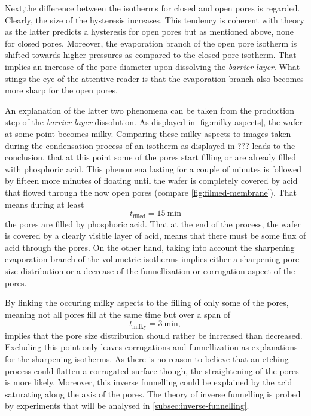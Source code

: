 \documentclass[../thesis.tex]{subfiles}
\begin{document}
        Next,the difference between the isotherms for closed and open pores is regarded. Clearly, the size of the hysteresis increases. This tendency is coherent with theory as the latter predicts a hysteresis for open pores but as mentioned above, none for closed pores. Moreover, the evaporation branch of the open pore isotherm is shifted towards higher pressures as compared to the closed pore isotherm. That implies an increase of the pore diameter upon dissolving the \textit{barrier layer}. What stings the eye of the attentive reader is that the evaporation branch also becomes more sharp for the open pores.

        An explanation of the latter two phenomena can be taken from the production step of the \textit{barrier layer} dissolution. As displayed in \cref{fig:milky-aspects}, the wafer at some point becomes milky. Comparing these milky aspects to images taken during the condensation process of an isotherm as displayed in ??? leads to the conclusion, that at this point some of the pores start filling or are already filled with phosphoric acid. This phenomena lasting for a couple of minutes is followed by fifteen more minutes of floating until the wafer is completely covered by acid that flowed through the now open pores (compare \cref{fig:filmed-membrane}). That means during at least
        \begin{equation}
          t_\mathrm{filled}=\SI{15}{\minute}
        \end{equation}
        the pores are filled by phosphoric acid. That at the end of the process, the wafer is covered by a clearly visible layer of acid, means that there must be some flux of acid through the pores. On the other hand, taking into account the sharpening evaporation branch of the volumetric isotherms implies either a sharpening pore size distribution or a decrease of the funnellization or corrugation aspect of the pores.

        By linking the occuring milky aspects to the filling of only some of the pores, meaning not all pores fill at the same time but over a span of
        \begin{equation}
          t_\mathrm{milky}=\SI{3}{\minute},
        \end{equation}
        implies that the pore size distribution should rather be increased than decreased. Excluding this point only leaves corrugations and funnellization as explanations for the sharpening isotherms. As there is no reason to believe that an etching process could flatten a corrugated surface though, the straightening of the pores is more likely. Moreover, this inverse funnelling could be explained by the acid saturating along the axis of the pores. The theory of inverse funnelling is probed by experiments that will be analysed in \cref{subsec:inverse-funnelling}.
\end{document}
